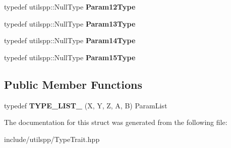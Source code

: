 \begin{DoxyCompactItemize}
\item 
\hypertarget{structutilspp_1_1PointerOnMemberFunction_3_01W_07V_1_1_5_08_07X_00_01Y_00_01Z_00_01A_00_01B_08_4_aeb6a99bad58dad9dcf0923b314175cb9}{typedef utilspp\-::\-Null\-Type {\bfseries Param12\-Type}}\label{structutilspp_1_1PointerOnMemberFunction_3_01W_07V_1_1_5_08_07X_00_01Y_00_01Z_00_01A_00_01B_08_4_aeb6a99bad58dad9dcf0923b314175cb9}

\item 
\hypertarget{structutilspp_1_1PointerOnMemberFunction_3_01W_07V_1_1_5_08_07X_00_01Y_00_01Z_00_01A_00_01B_08_4_aac512975b97c5f5b6d7a617e2d70c847}{typedef utilspp\-::\-Null\-Type {\bfseries Param13\-Type}}\label{structutilspp_1_1PointerOnMemberFunction_3_01W_07V_1_1_5_08_07X_00_01Y_00_01Z_00_01A_00_01B_08_4_aac512975b97c5f5b6d7a617e2d70c847}

\item 
\hypertarget{structutilspp_1_1PointerOnMemberFunction_3_01W_07V_1_1_5_08_07X_00_01Y_00_01Z_00_01A_00_01B_08_4_ad0022bb08e69fd51841ad371124f07f1}{typedef utilspp\-::\-Null\-Type {\bfseries Param14\-Type}}\label{structutilspp_1_1PointerOnMemberFunction_3_01W_07V_1_1_5_08_07X_00_01Y_00_01Z_00_01A_00_01B_08_4_ad0022bb08e69fd51841ad371124f07f1}

\item 
\hypertarget{structutilspp_1_1PointerOnMemberFunction_3_01W_07V_1_1_5_08_07X_00_01Y_00_01Z_00_01A_00_01B_08_4_a17cab6cc4f809e4b29d383259f398a88}{typedef utilspp\-::\-Null\-Type {\bfseries Param15\-Type}}\label{structutilspp_1_1PointerOnMemberFunction_3_01W_07V_1_1_5_08_07X_00_01Y_00_01Z_00_01A_00_01B_08_4_a17cab6cc4f809e4b29d383259f398a88}

\end{DoxyCompactItemize}
\subsection*{Public Member Functions}
\begin{DoxyCompactItemize}
\item 
\hypertarget{structutilspp_1_1PointerOnMemberFunction_3_01W_07V_1_1_5_08_07X_00_01Y_00_01Z_00_01A_00_01B_08_4_ae9abeb00f981096fbc8c58631a38c14b}{typedef {\bfseries T\-Y\-P\-E\-\_\-\-L\-I\-S\-T\-\_} (X, Y, Z, A, B) Param\-List}\label{structutilspp_1_1PointerOnMemberFunction_3_01W_07V_1_1_5_08_07X_00_01Y_00_01Z_00_01A_00_01B_08_4_ae9abeb00f981096fbc8c58631a38c14b}

\end{DoxyCompactItemize}


The documentation for this struct was generated from the following file\-:\begin{DoxyCompactItemize}
\item 
include/utilspp/Type\-Trait.\-hpp\end{DoxyCompactItemize}
